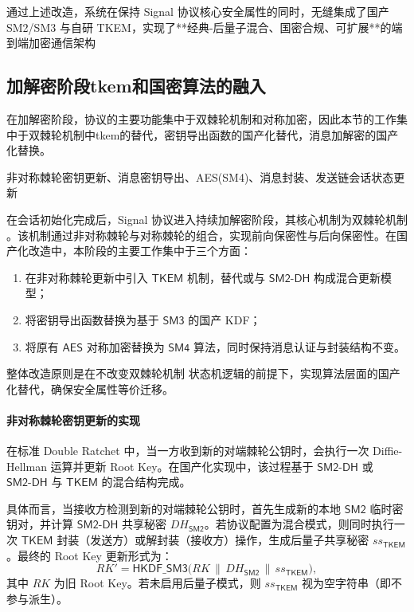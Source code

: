 通过上述改造，系统在保持 Signal 协议核心安全属性的同时，无缝集成了国产 SM2/SM3 与自研 TKEM，实现了**经典-后量子混合、国密合规、可扩展**的端到端加密通信架构

\subsection{加解密阶段tkem和国密算法的融入}
在加解密阶段，协议的主要功能集中于双棘轮机制和对称加密，因此本节的工作集中于双棘轮机制中tkem的替代，密钥导出函数的国产化替代，消息加解密的国产化替换。

非对称棘轮密钥更新、消息密钥导出、AES(SM4)、消息封装、发送链会话状态更新

在会话初始化完成后，Signal 协议进入持续加解密阶段，其核心机制为双棘轮机制 。该机制通过非对称棘轮与对称棘轮的组合，实现前向保密性与后向保密性。在国产化改造中，本阶段的主要工作集中于三个方面：
\begin{enumerate}
    \item 在非对称棘轮更新中引入 $\mathsf{TKEM}$ 机制，替代或与 $\mathsf{SM2\text{-}DH}$ 构成混合更新模型；
    \item 将密钥导出函数替换为基于 $\mathsf{SM3}$ 的国产 KDF；
    \item 将原有 $\mathsf{AES}$ 对称加密替换为 $\mathsf{SM4}$ 算法，同时保持消息认证与封装结构不变。
\end{enumerate}
整体改造原则是在不改变双棘轮机制 状态机逻辑的前提下，实现算法层面的国产化替代，确保安全属性等价迁移。

\paragraph{非对称棘轮密钥更新的实现}{}
\label{sec:asymmetric_ratchet}

在标准 Double Ratchet 中，当一方收到新的对端棘轮公钥时，会执行一次 Diffie-Hellman 运算并更新 Root Key。在国产化实现中，该过程基于 $\mathsf{SM2\text{-}DH}$ 或 $\mathsf{SM2\text{-}DH}$ 与 $\mathsf{TKEM}$ 的混合结构完成。

具体而言，当接收方检测到新的对端棘轮公钥时，首先生成新的本地 $\mathsf{SM2}$ 临时密钥对，并计算 $\mathsf{SM2\text{-}DH}$ 共享秘密 $DH_{\mathsf{SM2}}$。若协议配置为混合模式，则同时执行一次 $\mathsf{TKEM}$ 封装（发送方）或解封装（接收方）操作，生成后量子共享秘密 $ss_{\mathsf{TKEM}}$。最终的 Root Key 更新形式为：
\[
RK' = \mathsf{HKDF\_SM3}\big( RK \,\|\, DH_{\mathsf{SM2}} \,\|\, ss_{\mathsf{TKEM}} \big),
\]
其中 $RK$ 为旧 Root Key。若未启用后量子模式，则 $ss_{\mathsf{TKEM}}$ 视为空字符串（即不参与派生）。


